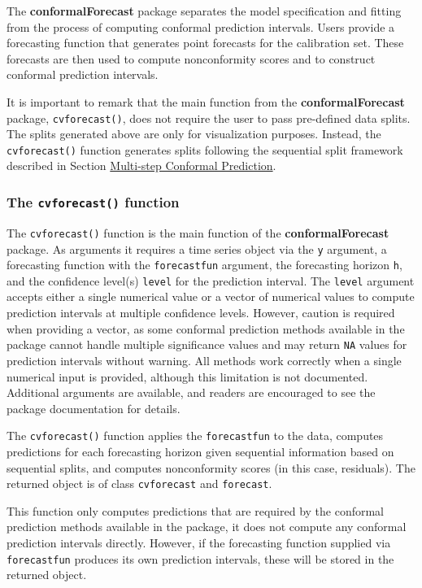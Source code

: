The \textbf{conformalForecast} package separates the model specification and
fitting from the process of computing conformal prediction intervals.
Users provide a forecasting function that generates point forecasts for
the calibration set. These forecasts are then used to compute
nonconformity scores and to construct conformal prediction intervals.

It is important to remark that the main function from the
\textbf{conformalForecast} package, \texttt{cvforecast()}, does not require the user
to pass pre-defined data splits. The splits generated above are only for
visualization purposes. Instead, the \texttt{cvforecast()} function generates
splits following the sequential split framework described in Section
\hyperref[multi-step-section]{Multi-step Conformal Prediction}.

\subsubsection{\texorpdfstring{The \texttt{cvforecast()} function}{The cvforecast() function}}\label{the-cvforecast-function}

The \texttt{cvforecast()} function is the main function of the
\textbf{conformalForecast} package. As arguments it requires a time series
object via the \texttt{y} argument, a forecasting function with the
\texttt{forecastfun} argument, the forecasting horizon \texttt{h}, and the confidence
level(s) \texttt{level} for the prediction interval. The \texttt{level} argument
accepts either a single numerical value or a vector of numerical values
to compute prediction intervals at multiple confidence levels. However,
caution is required when providing a vector, as some conformal
prediction methods available in the package cannot handle multiple
significance values and may return \texttt{NA} values for prediction intervals
without warning. All methods work correctly when a single numerical
input is provided, although this limitation is not documented.
Additional arguments are available, and readers are encouraged to see
the package documentation for details.

The \texttt{cvforecast()} function applies the \texttt{forecastfun} to the data,
computes predictions for each forecasting horizon given sequential
information based on sequential splits, and computes nonconformity
scores (in this case, residuals). The returned object is of class
\texttt{cvforecast} and \texttt{forecast}.

This function only computes predictions that are required by the
conformal prediction methods available in the package, it does not
compute any conformal prediction intervals directly. However, if the
forecasting function supplied via \texttt{forecastfun} produces its own
prediction intervals, these will be stored in the returned object.

